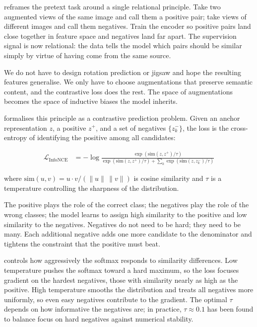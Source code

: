 
 reframes the pretext task around a single relational principle.
Take two augmented views of the same image and call them a positive pair; take views of different images and call them negatives.
Train the encoder so positive pairs land close together in feature space and negatives land far apart.
The supervision signal is now relational: the data tells the model which pairs should be similar simply by virtue of having come from the same source.

We do not have to design rotation prediction or jigsaw and hope the resulting features generalise.
We only have to choose augmentations that preserve semantic content, and the contrastive loss does the rest.
The space of augmentations becomes the space of inductive biases the model inherits.

\cite{vanDenOord2018InfoNCE} formalises this principle as a contrastive prediction problem.
Given an anchor representation $z$, a positive $z^+$, and a set of negatives $\{z^-_k\}$, the loss is the cross-entropy of identifying the positive among all candidates:

\begin{align}
    \mathcal{L}_{\text{InfoNCE}} &= -\log \frac{\exp(\text{sim}(z, z^+) / \tau)}{\exp(\text{sim}(z, z^+) / \tau) + \sum_k \exp(\text{sim}(z, z^-_k) / \tau)}
    \label{eq:infonce}
\end{align}

where $\text{sim}(u, v) = u \cdot v / (\|u\|\,\|v\|)$ is cosine similarity and $\tau$ is a temperature controlling the sharpness of the distribution.

The positive plays the role of the correct class; the negatives play the role of the wrong classes; the model learns to assign high similarity to the positive and low similarity to the negatives.
Negatives do not need to be hard; they need to be many.
Each additional negative adds one more candidate to the denominator and tightens the constraint that the positive must beat.

 controls how aggressively the softmax responds to similarity differences.
Low temperature pushes the softmax toward a hard maximum, so the loss focuses gradient on the hardest negatives, those with similarity nearly as high as the positive.
High temperature smooths the distribution and treats all negatives more uniformly, so even easy negatives contribute to the gradient.
The optimal $\tau$ depends on how informative the negatives are; in practice, $\tau \approx 0.1$ has been found to balance focus on hard negatives against numerical stability.

